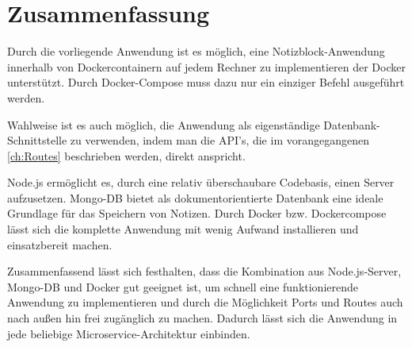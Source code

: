
\chapter{Zusammenfassung}
\label{ch:Zusammenfassung}
Durch die vorliegende Anwendung ist es möglich, eine Notizblock-Anwendung innerhalb von Dockercontainern auf jedem Rechner zu implementieren der Docker unterstützt.
Durch Docker-Compose muss dazu nur ein einziger Befehl ausgeführt werden.

Wahlweise ist es auch möglich, die Anwendung als eigenständige Datenbank-Schnittstelle zu verwenden, indem man die \acs{API}'s, die im vorangegangenen \autoref{ch:Routes} beschrieben werden, direkt anspricht.

Node.js ermöglicht es, durch eine relativ überschaubare Codebasis, einen Server aufzusetzen.
Mongo-DB bietet als dokumentorientierte Datenbank eine ideale Grundlage für das Speichern von Notizen.
Durch Docker bzw. Dockercompose lässt sich die komplette Anwendung mit wenig Aufwand installieren und einsatzbereit machen.

Zusammenfassend lässt sich festhalten, dass die Kombination aus Node.js-Server, Mongo-DB und Docker gut geeignet ist, um schnell eine funktionierende Anwendung zu implementieren und durch die Möglichkeit Ports und Routes auch nach außen hin frei zugänglich zu machen. Dadurch lässt sich die Anwendung in jede beliebige Microservice-Architektur einbinden. 